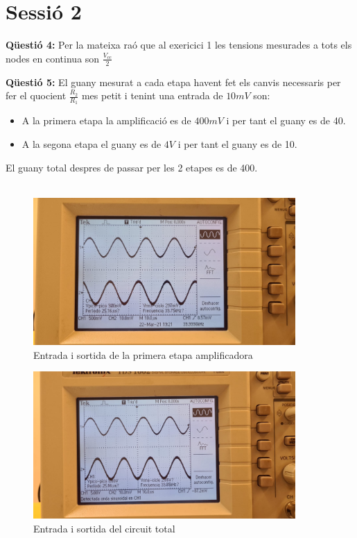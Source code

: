 \documentclass[12pt, a4papre]{article}
\begin{document}
	\section{Sessió 2}
	
	\textbf{Qüestió 4:} Per la mateixa raó que al exericici 1 les tensions mesurades a tots els nodes en continua son $\frac{V_{cc}}{2}$
	
	\textbf{Qüestió 5:} El guany mesurat a cada etapa havent fet els canvis necessaris per fer el quocient $\frac{R_2}{R_1}$ mes petit i tenint una entrada de $10mV$ son:
	
	\begin{itemize}
		\item A la primera etapa la amplificació es de $400mV$ i per tant el guany es de 40.
		\item A la segona etapa el guany es de $4V$ i per tant el guany es de 10.
	\end{itemize}
	El guany total despres de passar per les 2 etapes es de 400.\\\\
	
	\begin{figure}[H]
		\begin{center}
		\includegraphics[width=100mm]{img_2_3.jpeg}
		\caption{Entrada i sortida de la primera etapa amplificadora}
		\end{center}
	\end{figure}
	
	\begin{figure}[H]
		\begin{center}
		\includegraphics[width=100mm]{img_2_4.jpeg}
		\caption{Entrada i sortida del circuit total}
		\end{center}
	\end{figure}
	
\end{document}
